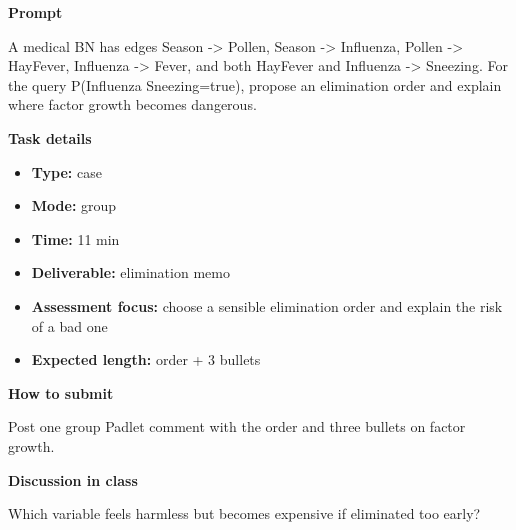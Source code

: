 \documentclass[11pt]{article}
\begin{document}
\begin{tcolorbox}[colback=white,colframe=MidnightBlue,title={Q4 Variable Elimination and Complexity},fonttitle=\bfseries,breakable]
\begin{center}
\end{center}

{\large\bfseries\color{MidnightBlue} Prompt}\par\medskip
A medical BN has edges Season -\textgreater{} Pollen, Season -\textgreater{} Influenza, Pollen -\textgreater{} HayFever, Influenza -\textgreater{} Fever, and both HayFever and Influenza -\textgreater{} Sneezing. For the query P(Influenza \textbar{} Sneezing=true), propose an elimination order and explain where factor growth becomes dangerous.

{\large\bfseries\color{MidnightBlue} Task details}\par\medskip
\begin{itemize}\item \textbf{Type:} case
\item \textbf{Mode:} group
\item \textbf{Time:} 11 min
\item \textbf{Deliverable:} elimination memo
\item \textbf{Assessment focus:} choose a sensible elimination order and explain the risk of a bad one
\item \textbf{Expected length:} order + 3 bullets\end{itemize}

{\large\bfseries\color{MidnightBlue} How to submit}\par\medskip
Post one group Padlet comment with the order and three bullets on factor growth.

{\large\bfseries\color{MidnightBlue} Discussion in class}\par\medskip
Which variable feels harmless but becomes expensive if eliminated too early?


\end{tcolorbox}
\end{document}
